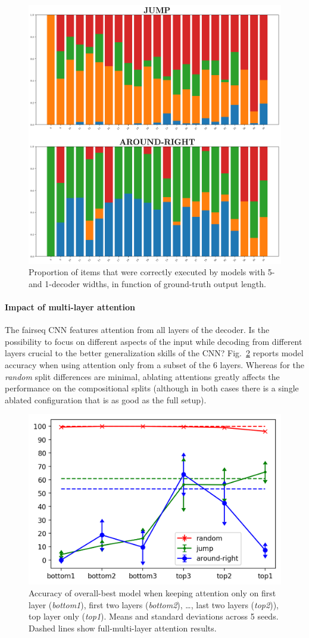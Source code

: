 \begin{figure}[tb]
    \centering
    \includegraphics[width=.5\textwidth,keepaspectratio]{figures/split_subset_out.png}
    \caption{Proportion of items that were correctly executed by
      models with 5- and 1-decoder widths, in function of ground-truth
      output length.}
    \label{fig:kernel_width}
\end{figure}

\paragraph{Impact of multi-layer attention}
\label{subsec:exp3}

The fairseq CNN features attention from all layers of the
decoder. Is the possibility to focus on different aspects of the input
while decoding from different layers crucial to the better
generalization skills of the CNN? Fig.~\ref{fig:exp3} reports model
accuracy when using attention only from a subset of the 6
layers. Whereas for the \emph{random} split differences are minimal,
ablating attentions greatly affects the performance on the
compositional splits (although in both cases there is a single ablated
configuration that is as good as the full setup).

\begin{figure}[tb]
    \centering
    \includegraphics[width=.5\textwidth,keepaspectratio]{figures/attention_exp.png}
    \caption{Accuracy of overall-best model when keeping attention
      only on first layer (\emph{bottom1}), first two layers
      (\emph{bottom2}), \ldots, last two layers (\emph{top2})), top
      layer only (\emph{top1}). Means and standard deviations across 5
      seeds. Dashed lines show full-multi-layer attention results.}
    \label{fig:exp3}
\end{figure}

